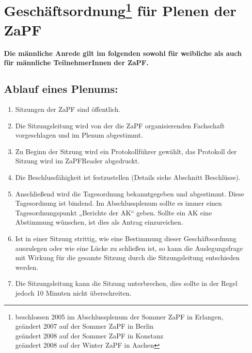 



\chapter*{Geschäftsordnung\footnote{beschlossen 2005 im Abschlussplenum der Sommer ZaPF in Erlangen,\\ geändert 2007 auf der Sommer ZaPF in Berlin\\geändert 2008 auf der Sommer ZaPF in Konstanz\\geändert 2008 auf der Winter ZaPF in Aachen } für Plenen der ZaPF}


\noindent \textbf{Die männliche Anrede gilt im folgenden sowohl für
weibliche als auch für männliche
 TeilnehmerInnen der ZaPF.}

\section{Ablauf eines Plenums:}
\begin{enumerate}

\item{Sitzungen der ZaPF sind öffentlich.}

\item{Die Sitzungsleitung wird von der die ZaPF organisierenden Fachschaft vorgeschlagen und im
Plenum abgestimmt.}

\item{Zu Beginn der Sitzung wird ein Protokollführer gewählt, das Protokoll der Sitzung wird im ZaPFReader
abgedruckt.}

\item{Die Beschlussfähigkeit ist festzustellen (Details siehe Abschnitt Beschlüsse).}

\item{Anschließend wird die Tagesordnung bekanntgegeben und abgestimmt. Diese Tagesordnung ist
bindend. Im Abschlussplenum sollte es immer einen Tagesordnungspunkt „Berichte der AK“ geben.
Sollte ein AK eine Abstimmung wünschen, ist dies als Antrag einzureichen.}

\item{ Ist in einer Sitzung strittig, wie eine Bestimmung dieser Geschäftsordnung auszulegen oder wie eine
Lücke zu schließen ist, so kann die Auslegungsfrage mit Wirkung für die gesamte Sitzung durch die
Sitzungsleitung entschieden werden.}

\item{Die Sitzungsleitung kann die Sitzung unterbrechen, dies sollte in der Regel jedoch 10 Minuten nicht
überschreiten.}
\end{enumerate}

